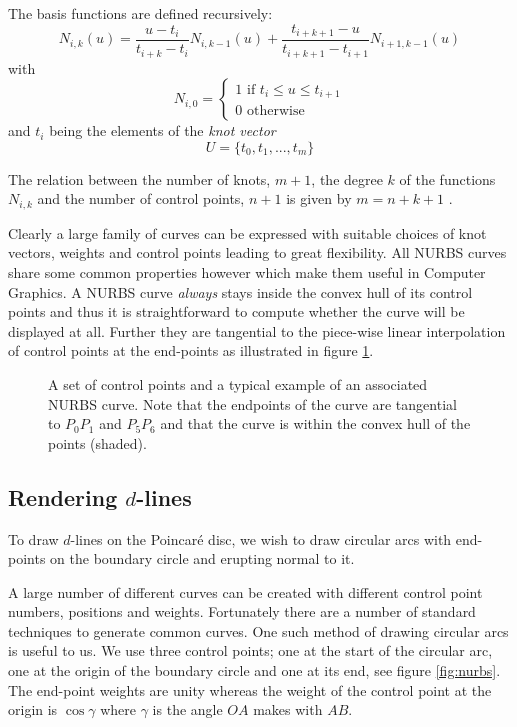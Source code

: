 The basis functions are defined recursively:
\[
N_{i,k}(u) = \frac{u - t_i}{t_{i+k} - t_i} N_{i,k-1}(u) +
  \frac{t_{i+k+1} - u}{t_{i+k+1} - t_{i+1}} N_{i+1,k-1}(u)
\]
with
\[
N_{i,0} = 
\begin{cases}
1 \mbox{ if } t_i \le u \le t_{i+1} \\ 
0 \mbox{ otherwise} 
\end{cases}
\]
and $t_i$ being the elements of the \emph{knot vector}
\[
U = \{ t_0, t_1, ... , t_m \}
\]

The relation between the number of knots, $m+1$, the degree $k$ of 
the functions $N_{i,k}$ and the number of control points, $n+1$
is given by $m = n + k + 1$ \cite{peigl, rogers}.

Clearly a large family of curves can be expressed with suitable choices
of knot vectors, weights and control points leading to great flexibility.
All NURBS curves share some common properties however which make them
useful in Computer Graphics. A NURBS curve \emph{always} stays inside the
convex hull of its control points \cite{rogers} and thus it is straightforward
to compute whether the curve will be displayed at all. Further they
are tangential to the piece-wise linear interpolation of control
points at the end-points as illustrated in figure \ref{fig:samplenurb}.

\begin{figure} \centering
{}
\caption{A set of control points and a typical example of an associated
NURBS curve. Note that the endpoints of the curve are tangential to
$P_0P_1$ and $P_5P_6$ and that the curve is within the convex hull
of the points (shaded).}
\label{fig:samplenurb}
\end{figure}

\subsection{Rendering $d$-lines}

To draw $d$-lines on the Poincar\'e disc, we wish to draw circular arcs
with end-points on the boundary circle and erupting normal to it.

A large number of different curves can be created with different control 
point numbers, positions and weights. Fortunately there are a number of
standard techniques to generate common curves. One such method of
drawing circular arcs\cite{NURBS:arc} is useful to us. We use three control
points; one at the start of the circular arc, one at the origin of the
boundary circle and one
at its end, see figure \ref{fig:nurbs}. 
The end-point weights are unity whereas the weight of the control
point at the origin is $\cos \gamma$ where $\gamma$ is the angle
$OA$ makes with $AB$.

